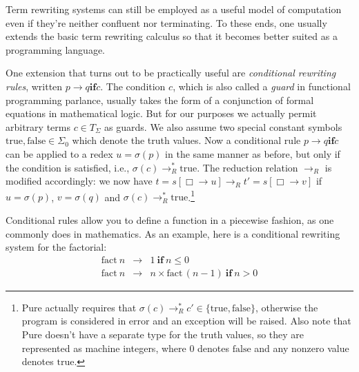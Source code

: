 \documentclass[a4paper,12pt]{article}
\begin{document}
Term rewriting systems can still be employed as a useful model of computation even if they're neither confluent nor terminating. To these ends, one usually extends the basic term rewriting calculus so that it becomes better suited as a programming language.

One extension that turns out to be practically useful are \emph{conditional rewriting rules}, written $p\rightarrow q\mathrel{\mathbf{if}} c$. The condition $c$, which is also called a \emph{guard} in functional programming parlance, usually takes the form of a conjunction of formal equations in mathematical logic. But for our purposes we actually permit arbitrary terms $c\in T_\Sigma$ as guards. We also assume two special constant symbols $\mathrm{true},\mathrm{false}\in\Sigma_0$ which denote the truth values. Now a conditional rule $p\rightarrow q\mathrel{\mathbf{if}} c$ can be applied to a redex $u=\sigma(p)$ in the same manner as before, but only if the condition is satisfied, i.e., $\sigma(c)\mathrel{\rightarrow_R^*}\mathrm{true}$. The reduction relation $\rightarrow_R$ is modified accordingly: we now have $t=s[\Box\rightarrow u]\mathrel{\rightarrow_R} t'=s[\Box\rightarrow v]$ if $u=\sigma(p)$, $v=\sigma(q)$ and $\sigma(c)\mathrel{\rightarrow_R^*}\mathrm{true}$.\footnote{Pure actually requires that $\sigma(c)\mathrel{\rightarrow_R^*}c'\in\{\mathrm{true},\mathrm{false}\}$, otherwise the program is considered in error and an exception will be raised. Also note that Pure doesn't have a separate type for the truth values, so they are represented as machine integers, where 0 denotes $\mathrm{false}$ and any nonzero value denotes $\mathrm{true}$.}

Conditional rules allow you to define a function in a piecewise fashion, as one commonly does in mathematics. As an example, here is a conditional rewriting system for the factorial:
\begin{eqnarray*}
  \mathrm{fact}\ n&\rightarrow&1\ \mathbf{if}\ n\leq 0\\
  \mathrm{fact}\ n&\rightarrow&n\times\mathrm{fact}\,(n-1)\ \mathbf{if}\ n>0
\end{eqnarray*}
\end{document}

